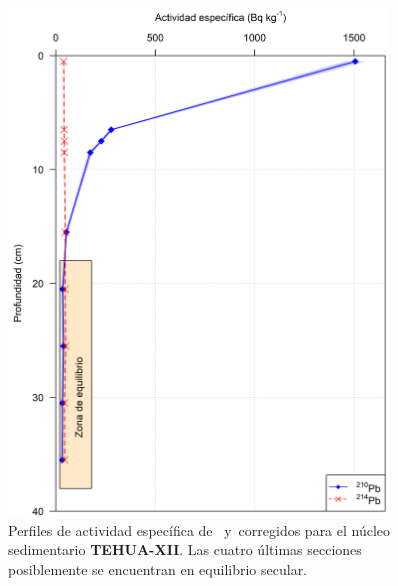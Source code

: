 \begin{figure}
\centering
\includegraphics[width=0.9\textwidth]{Imagenes/Act_210Pb_214Pb_TEHUA-XII.png}
\caption{Perfiles de actividad específica de \PbCero\, y \PbCuatro\,corregidos para el núcleo sedimentario \textbf{TEHUA-XII}. Las cuatro últimas secciones posiblemente se encuentran en equilibrio secular.}\label{Fig-TEHUAXII-Comp}
\end{figure}
